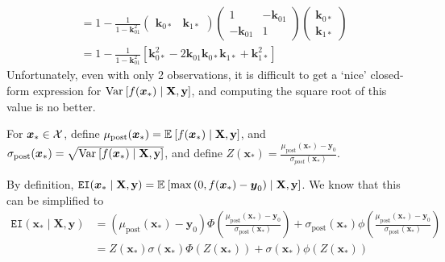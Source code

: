\documentclass[11pt]{article}
\numberwithin{figure}{section}
\numberwithin{equation}{section}
\def\BayesOpt{\texttt{BayesOpt}}
\def\EI{\texttt{EI}}
\newcommand{\bs}[1]{\boldsymbol{#1}}
\def\bsx{\bs{x}}
\def\bsy{\bs{y}}
\def\bsk{\bs{k}}
\def\xast{\bsx_{*}}
\begin{document}
\begin{align*}
&= 1 - \frac{1}{1 - \bsk_{01}^{2}}\begin{pmatrix}\bsk_{0*} & \bsk_{1*}\end{pmatrix}\begin{pmatrix}1 & -\bsk_{01}\\ -\bsk_{01} & 1\end{pmatrix}\begin{pmatrix}\bsk_{0*}\\ \bsk_{1*}\end{pmatrix}\\
&= 1 - \frac{1}{1 - \bsk_{01}^{2}}\left[\bsk_{0*}^{2} - 2\bsk_{01}\bsk_{0*}\bsk_{1*} + \bsk_{1*}^{2}\right]%
\end{align*}
Unfortunately, even with only 2 observations, it is difficult to get a `nice' closed-form expression for $\var{f(\xast) \mid \mathbf{X}, \mathbf{y}}$, and computing the square root of this value is no better. 

For $\xast \in \calX$, define $\mu_{\textrm{post}}(\xast) = \expec{f(\xast) \mid \mathbf{X}, \mathbf{y}}$, and $\sigma_{\textrm{post}}(\xast) = \sqrt{\var{f(\xast) \mid \mathbf{X}, \mathbf{y}}}$, and define $Z(\xast) = \frac{\mu_{\textrm{post}}(\xast) - \bsy_{0}}{\sigma_{post}(\xast)}$. 

By definition, $\EI(\xast \mid \mathbf{X}, \mathbf{y}) = \expec{\max\left(0, f(\xast) - \bsy_{0}\right) \mid \mathbf{X}, \mathbf{y}}$. We know that this can be simplified to 
\begin{align*}
\EI(\xast \mid \mathbf{X}, \mathbf{y}) &= \left(\mu_{\textrm{post}}(\xast) - \bsy_{0}\right)\Phi\left(\frac{\mu_{\textrm{post}}(\xast) - \bsy_{0}}{\sigma_{\textrm{post}}(\xast)}\right) + \sigma_{\textrm{post}}(\xast)\phi\left(\frac{\mu_{\textrm{post}}(\xast) - \bsy_{0}}{\sigma_{\textrm{post}}(\xast)}\right)\\
& = Z(\xast)\sigma(\xast)\Phi(Z(\xast)) + \sigma(\xast)\phi(Z(\xast))
\end{align*}

\end{document}

